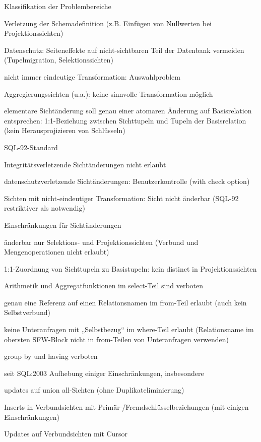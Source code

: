 \documentclass[a4paper]{article}
\begin{document}
\begin{multicols}{3}
\begin{itemize*}
    Klassifikation der Problembereiche
    \begin{itemize*}
        \item Verletzung der Schemadefinition (z.B. Einfügen von Nullwerten bei Projektionssichten)
        \item Datenschutz: Seiteneffekte auf nicht-sichtbaren Teil der Datenbank vermeiden (Tupelmigration, Selektionssichten)
        \item nicht immer eindeutige Transformation: Auswahlproblem
        \item Aggregierungssichten (u.a.): keine sinnvolle Transformation möglich
        \item elementare Sichtänderung soll genau einer atomaren Änderung auf Basisrelation entsprechen: 1:1-Beziehung zwischen Sichttupeln und Tupeln der Basisrelation (kein Herausprojizieren von Schlüsseln)
    \end{itemize*}

    SQL-92-Standard
    \begin{itemize*}
        \item Integritätsverletzende Sichtänderungen nicht erlaubt
        \item datenschutzverletzende Sichtänderungen: Benutzerkontrolle (with check option)
        \item Sichten mit nicht-eindeutiger Transformation: Sicht nicht änderbar (SQL-92 restriktiver als notwendig)
    \end{itemize*}

    Einschränkungen für Sichtänderungen
    \begin{itemize*}
        \item änderbar nur Selektions- und Projektionssichten (Verbund und Mengenoperationen nicht erlaubt)
        \item 1:1-Zuordnung von Sichttupeln zu Basistupeln: kein distinct in Projektionssichten
        \item Arithmetik und Aggregatfunktionen im select-Teil sind verboten
        \item genau eine Referenz auf einen Relationsnamen im from-Teil erlaubt (auch kein Selbstverbund)
        \item keine Unteranfragen mit „Selbstbezug“ im where-Teil erlaubt (Relationsname im obersten SFW-Block nicht in from-Teilen von Unteranfragen verwenden)
        \item group by und having verboten
        \item seit SQL:2003 Aufhebung einiger Einschränkungen, insbesondere
        \begin{itemize*}
            \item updates auf union all-Sichten (ohne Duplikateliminierung)
            \item Inserts in Verbundsichten mit Primär-/Fremdschlüsselbeziehungen (mit einigen Einschränkungen)
            \item Updates auf Verbundsichten mit Cursor
        \end{itemize*}
    \end{itemize*}


\end{itemize*}
\end{multicols}
\end{document}
